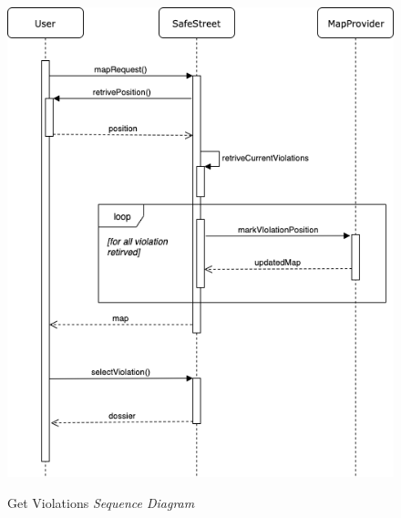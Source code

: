 \documentclass[../RASD.tex]{subfiles}
\begin{document}
                \begin{figure}[H]
                    \centering
                    \includegraphics[scale = 2]{assets/getViolationSD.png}\\[1.6 cm]
                    \caption[Get Violations \textit{Sequence Diagram}]{Get Violations \textit{Sequence Diagram}}
                \end{figure}
\end{document}
